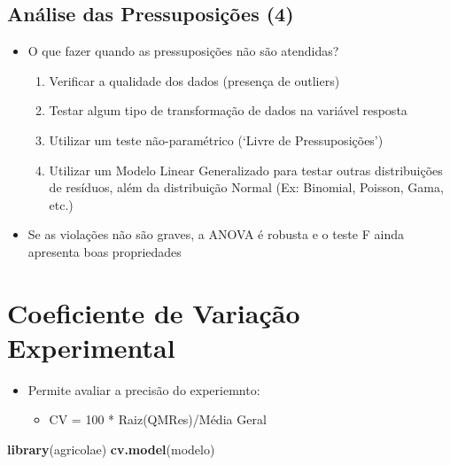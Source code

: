\documentclass[
]{book}
\newenvironment{Shaded}{\begin{snugshade}}{\end{snugshade}}
\newcommand{\FunctionTok}[1]{\textcolor[rgb]{0.13,0.29,0.53}{\textbf{#1}}}
\newcommand{\NormalTok}[1]{#1}
\providecommand{\tightlist}{%
  \setlength{\itemsep}{0pt}\setlength{\parskip}{0pt}}
\begin{document}
\subsection{Análise das Pressuposições (4)}\label{anuxe1lise-das-pressuposiuxe7uxf5es-4}

\begin{itemize}
\tightlist
\item
  O que fazer quando as pressuposições não são atendidas?

  \begin{enumerate}
  \def\labelenumi{\arabic{enumi}.}
  \tightlist
  \item
    Verificar a qualidade dos dados (presença de outliers)
  \item
    Testar algum tipo de transformação de dados na variável resposta
  \item
    Utilizar um teste não-paramétrico (`Livre de Pressuposições')
  \item
    Utilizar um Modelo Linear Generalizado para testar outras distribuições de resíduos, além da distribuição Normal (Ex: Binomial, Poisson, Gama, etc.)
  \end{enumerate}
\item
  Se as violações não são graves, a ANOVA é robusta e o teste F ainda apresenta boas propriedades
\end{itemize}

\section{Coeficiente de Variação Experimental}\label{coeficiente-de-variauxe7uxe3o-experimental}

\begin{itemize}
\item
  Permite avaliar a precisão do experiemnto:

  \begin{itemize}
  \tightlist
  \item
    CV = 100 * Raiz(QMRes)/Média Geral
  \end{itemize}
\end{itemize}

\begin{Shaded}
\begin{Highlighting}[]
\FunctionTok{library}\NormalTok{(agricolae)}
\FunctionTok{cv.model}\NormalTok{(modelo)}
\end{Highlighting}
\end{Shaded}
\end{document}

